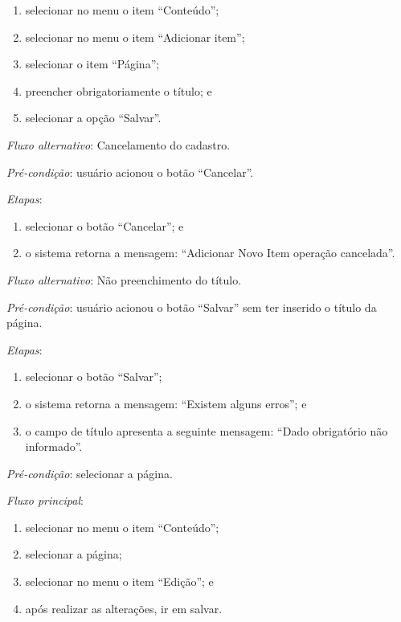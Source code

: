 \begin{enumerate}
    \item selecionar no menu o item ``Conteúdo'';
    \item selecionar no menu o item ``Adicionar item'';
    \item selecionar o item ``Página'';
    \item preencher obrigatoriamente o título; e
    \item selecionar a opção ``Salvar''.
\end{enumerate}

\noindent \textit{Fluxo alternativo}: Cancelamento do cadastro.

\noindent \textit{Pré-condição}: usuário acionou o botão ``Cancelar''.

\noindent \textit{Etapas}:

\begin{enumerate}
    \item selecionar o botão ``Cancelar''; e
    \item o sistema retorna a mensagem: ``Adicionar Novo Item operação cancelada''.
\end{enumerate}

\noindent \textit{Fluxo alternativo}: Não preenchimento do título.

\noindent \textit{Pré-condição}: usuário acionou o botão ``Salvar'' sem ter inserido o título da página.

\noindent \textit{Etapas}:

\begin{enumerate}
    \item selecionar o botão ``Salvar'';
    \item o sistema retorna a mensagem: ``Existem alguns erros''; e
    \item o campo de título apresenta a seguinte mensagem: ``Dado obrigatório não informado''.
\end{enumerate}



\vspace{0.7cm}

\noindent \textit{Pré-condição}: selecionar a página.

\noindent \textit{Fluxo principal}:

\begin{enumerate}
    \item selecionar no menu o item ``Conteúdo'';
    \item selecionar a página;
    \item selecionar no menu o item ``Edição''; e
    \item após realizar as alterações, ir em salvar.
\end{enumerate}

